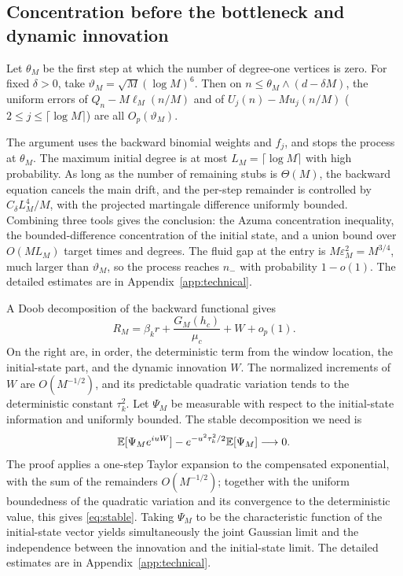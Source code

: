 \subsection{Concentration before the bottleneck and dynamic innovation}\label{sec:mp-stop}
\begin{lemma}
Let $\theta_M$ be the first step at which the number of degree-one vertices is zero. For fixed $\delta>0$,
take $\vartheta_M=\sqrt M(\log M)^6$. Then on $n\le\theta_M\wedge(d-\delta M)$, the uniform errors of
$Q_n-M\ell_M(n/M)$ and of $U_j(n)-M u_j(n/M)$ ($2\le j\le\lceil\log M\rceil$) are all $O_p(\vartheta_M)$.
\end{lemma}
The argument uses the backward binomial weights and $f_j$, and stops the process at $\theta_M$. The maximum
initial degree is at most $L_M=\lceil\log M\rceil$ with high probability. As long as the number of remaining
stubs is $\Theta(M)$, the backward equation cancels the main drift, and the per-step remainder is controlled
by $C_\delta L_M^4/M$, with the projected martingale difference uniformly bounded. Combining three tools
gives the conclusion: the Azuma concentration inequality, the bounded-difference concentration of the initial
state, and a union bound over $O(ML_M)$ target times and degrees. The fluid gap at the entry is
$M\varepsilon_M^2=M^{3/4}$, much larger than $\vartheta_M$, so the process reaches $n_-$ with probability
$1-o(1)$. The detailed estimates are in Appendix~\ref{app:technical}.

A Doob decomposition of the backward functional gives
\begin{equation}
R_M=\beta_k r+\frac{G_M(h_c)}{\mu_c}+W+o_p(1).\label{eq:decomp}
\end{equation}
On the right are, in order, the deterministic term from the window location, the initial-state part, and the
dynamic innovation $W$. The normalized increments of $W$ are $O(M^{-1/2})$, and its predictable quadratic
variation tends to the deterministic constant $\tau_k^2$. Let $\Psi_M$ be measurable with respect to the
initial-state information and uniformly bounded. The stable decomposition we need is
\begin{equation}
\mathbb E[\Psi_Me^{iuW}]-e^{-u^2\tau_k^2/2}\mathbb E[\Psi_M]\longrightarrow0.\label{eq:stable}
\end{equation}
The proof applies a one-step Taylor expansion to the compensated exponential, with the sum of the remainders
$O(M^{-1/2})$; together with the uniform boundedness of the quadratic variation and its convergence to the
deterministic value, this gives \eqref{eq:stable}. Taking $\Psi_M$ to be the characteristic function of the
initial-state vector yields simultaneously the joint Gaussian limit and the independence between the
innovation and the initial-state limit. The detailed estimates are in Appendix~\ref{app:technical}.

